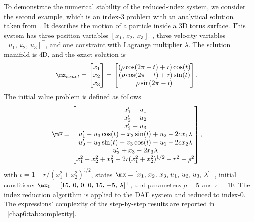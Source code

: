 To demonstrate the numerical stability of the reduced-index system, we consider the second example, which is an index-3 problem with an analytical solution, taken from~\cite{campbell1995constraint}. It describes the motion of a particle inside a 3D torus surface. This system has three position variables $[x_{1}, \, x_{2}, \, x_{3}]^\top$, three velocity variables $[u_{1}, \, u_{2}, \, u_{3}]^\top$, and one constraint with Lagrange multiplier $\lambda$. The solution manifold is 4D, and the exact solution is
%
\begin{equation}
  \label{chap6:eq:torus_solution}
  \mx_{exact} = \begin{bmatrix}
    x_{1} \\ x_{2} \\ x_{3}
  \end{bmatrix} = \begin{bmatrix}
    (\rho \cos(2\pi - t) + r) \cos(t) \\
    (\rho \cos(2\pi - t) + r) \sin(t) \\
    \rho \sin(2\pi - t)
  \end{bmatrix}.
\end{equation}
%
The initial value problem is defined as follows
%
\begin{equation}
  \label{chap6:eq:torus}
  \mF = \begin{bmatrix}
    x^{\prime}_{1} - u_{1} \\
    x^{\prime}_{2} - u_{2} \\
    x^{\prime}_{3} - u_{3} \\
    u^{\prime}_{1} - u_{3}\cos(t) + x_{3}\sin(t) + u_{2} - 2 c x_{1}\lambda \\
    u^{\prime}_{2} - u_{3}\sin(t) - x_{3}\cos(t) - u_{1} - 2 c x_{2}\lambda \\
    u^{\prime}_{3} + x_{3} - 2x_{3}\lambda \\
    x_{1}^2 + x_{2}^2 + x_{3}^2 - 2r(x_{1}^2 + x_{2}^2)^{1/2} + r^2 - \rho^2
  \end{bmatrix},
\end{equation}
%
with $c = 1 - {r} / {(x_{1}^2 + x_{2}^2)^{1/2}}$, states $\mx = [x_{1}, \, x_{2}, \, x_{3}, \, u_{1}, \, u_{2}, \, u_{3}, \, \lambda]^{\top}$, initial conditions $\mx_{0} = [15, \, 0, \, 0, \, 0, \, 15, \, -5, \, \lambda]^{\top}$, and parameters $\rho = 5$ and $r = 10$. The index reduction algorithm is applied to the \ac{DAE} system and reduced to index-0. The expressions' complexity of the step-by-step results are reported in \tablename{}~\ref{chap6:tab:complexity}.

